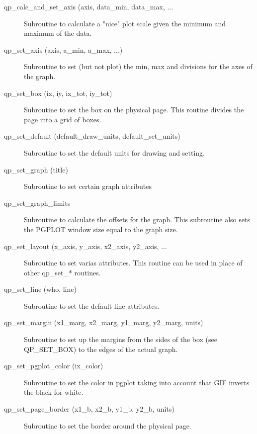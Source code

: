 \begin{description}

\item[qp\_calc\_and\_set\_axis (axis, data\_min, data\_max, ... ] \Newline
     Subroutine to calculate a "nice" plot scale given the minimum and maximum
     of the data. 

\item[qp\_set\_axis (axis, a\_min, a\_max, ...)] \Newline
    Subroutine to set (but not plot) the min, max and divisions for the axes of the graph.

\item[qp\_set\_box (ix, iy, ix\_tot, iy\_tot) ] \Newline 
     Subroutine to set the box on the physical page.
     This routine divides the page into a grid of boxes. 

\item[qp\_set\_default (default\_draw\_units, default\_set\_units)] \Newline 
     Subroutine to set the default units for drawing and setting.

\item[qp\_set\_graph (title)] \Newline 
     Subroutine to set certain graph attributes

\item[qp\_set\_graph\_limits] \Newline 
     Subroutine to calculate the offsets for the graph.
     This subroutine also sets the PGPLOT window size equal to the graph size.

\item[qp\_set\_layout (x\_axis, y\_axis, x2\_axis, y2\_axis, ...] \Newline 
     Subroutine to set varias attributes. This routine can be used
     in place of other qp\_set\_* routines.

\item[qp\_set\_line (who, line)] \Newline 
     Subroutine to set the default line attributes.

\item[qp\_set\_margin (x1\_marg, x2\_marg, y1\_marg, y2\_marg, units)] \Newline 
     Subroutine to set up the margins from the sides of the box (see QP\_SET\_BOX)
     to the edges of the actual graph.

\item[qp\_set\_pgplot\_color (ix\_color) ] \Newline 
     Subroutine to set the color in pgplot taking into account that GIF
     inverts the black for white.

\item[qp\_set\_page\_border (x1\_b, x2\_b, y1\_b, y2\_b, units)] \Newline 
     Subroutine to set the border around the physical page.


\end{description}
